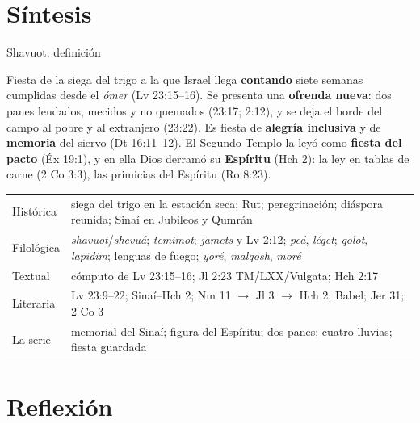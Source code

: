 \documentclass[hyperref={bookmarks=false},aspectratio=169]{beamer}
\newcommand{\destacar}[1]{\textbf{\textcolor{tierraroja}{#1}}}
\begin{document}
\section{Síntesis}

\begin{frame}{Shavuot: definición}
\begin{tcolorbox}[colback=papiro,colframe=tierraroja,boxrule=1pt,arc=3pt]
\small\RaggedRight Fiesta de la siega del trigo a la que Israel llega \destacar{contando} siete semanas cumplidas desde el \emph{ómer} (Lv 23:15--16). Se presenta una \destacar{ofrenda nueva}: dos panes leudados, mecidos y no quemados (23:17; 2:12), y se deja el borde del campo al pobre y al extranjero (23:22). Es fiesta de \destacar{alegría inclusiva} y de \destacar{memoria} del siervo (Dt 16:11--12). El Segundo Templo la leyó como \destacar{fiesta del pacto} (Éx 19:1), y en ella Dios derramó su \destacar{Espíritu} (Hch 2): la ley en tablas de carne (2 Co 3:3), las primicias del Espíritu (Ro 8:23).
\end{tcolorbox}
\scriptsize\renewcommand{\arraystretch}{1.08}
\begin{tabular}{@{}L{1.8cm}L{10.1cm}@{}}
\toprule
Histórica & siega del trigo en la estación seca; Rut; peregrinación; diáspora reunida; Sinaí en Jubileos y Qumrán \\
Filológica & \emph{shavuot}/\emph{shevuá}; \emph{temimot}; \emph{jamets} y Lv 2:12; \emph{peá}, \emph{léqet}; \emph{qolot}, \emph{lapidim}; lenguas de fuego; \emph{yoré}, \emph{malqosh}, \emph{moré} \\
Textual & cómputo de Lv 23:15--16; Jl 2:23 TM/LXX/Vulgata; Hch 2:17 \\
Literaria & Lv 23:9--22; Sinaí--Hch 2; Nm 11 $\rightarrow$ Jl 3 $\rightarrow$ Hch 2; Babel; Jer 31; 2 Co 3 \\
La serie & memorial del Sinaí; figura del Espíritu; dos panes; cuatro lluvias; fiesta guardada \\
\bottomrule
\end{tabular}
\end{frame}

\section{Reflexión}
\end{document}
